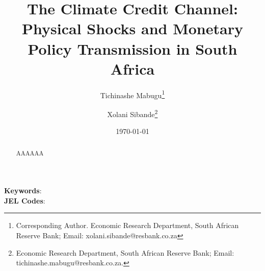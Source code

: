 \title{The Climate Credit Channel: Physical Shocks and Monetary Policy Transmission in South Africa}





\author { Tichinashe Mabugu\footnote{Corresponding Author. Economic Research Department, South African Reserve Bank; Email: xolani.sibande@resbank.co.za} \and Xolani Sibande\footnote{Economic Research Department, South African Reserve Bank; Email: tichinashe.mabugu@resbank.co.za.}} 


\date{\today}
\maketitle

\begin{abstract}
AAAAAA

\end{abstract}

\noindent\textbf{Keywords}: \\
\textbf{JEL Codes}: 
\newpage